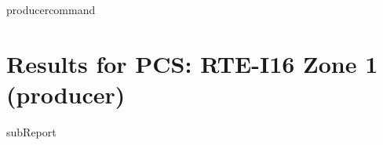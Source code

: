 {{ producercommand }}



    \section{Results for PCS: RTE-I16 Zone 1 ({{producer}})}

    {{subReport}}
    \newpage

